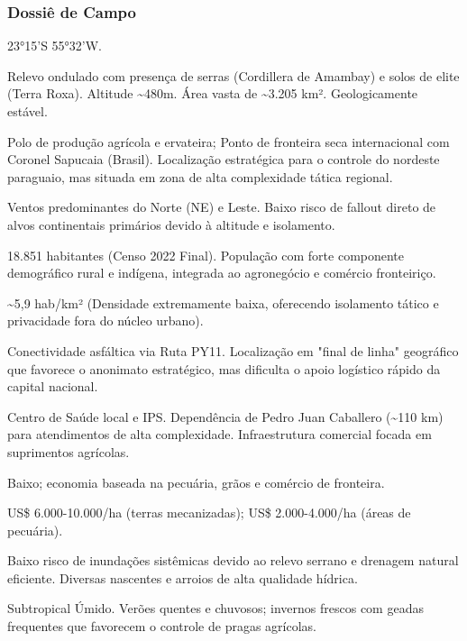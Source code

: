 \subsubsection{Dossiê de Campo}
\begin{description}[style=nextline,leftmargin=0.5cm,font=\bfseries]
\item[Coordenadas]  23°15'S 55°32'W.
\item[Topografia]  Relevo ondulado com presença de serras (Cordillera de Amambay) e solos de elite (Terra Roxa). Altitude \textasciitilde 480m. Área vasta de \textasciitilde 3.205 km². Geologicamente estável.
\item[Alvos Estratégicos]  Polo de produção agrícola e ervateira; Ponto de fronteira seca internacional com Coronel Sapucaia (Brasil). Localização estratégica para o controle do nordeste paraguaio, mas situada em zona de alta complexidade tática regional.
\item[Fallout]  Ventos predominantes do Norte (NE) e Leste. Baixo risco de fallout direto de alvos continentais primários devido à altitude e isolamento.
\item[População]  18.851 habitantes (Censo 2022 Final). População com forte componente demográfico rural e indígena, integrada ao agronegócio e comércio fronteiriço.
\item[Densidade]  \textasciitilde 5,9 hab/\allowbreak km² (Densidade extremamente baixa, oferecendo isolamento tático e privacidade fora do núcleo urbano).
\item[Vias de Acesso]  Conectividade asfáltica via Ruta PY11. Localização em "final de linha" geográfico que favorece o anonimato estratégico, mas dificulta o apoio logístico rápido da capital nacional.
\item[Serviços]  Centro de Saúde local e IPS. Dependência de Pedro Juan Caballero (\textasciitilde 110 km) para atendimentos de alta complexidade. Infraestrutura comercial focada em suprimentos agrícolas.
\item[Custo de Vida]  Baixo; economia baseada na pecuária, grãos e comércio de fronteira.
\item[Preço da Terra]  US\$ 6.000-10.000/\allowbreak ha (terras mecanizadas); US\$ 2.000-4.000/\allowbreak ha (áreas de pecuária).
\item[Hidrologia]  Baixo risco de inundações sistêmicas devido ao relevo serrano e drenagem natural eficiente. Diversas nascentes e arroios de alta qualidade hídrica.
\item[Clima]  Subtropical Úmido. Verões quentes e chuvosos; invernos frescos com geadas frequentes que favorecem o controle de pragas agrícolas.

\end{description}
